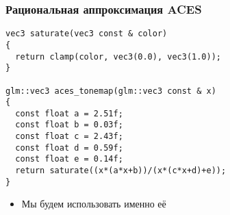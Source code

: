 \documentclass[10pt,handout]{beamer}
\begin{document}
\begin{frame}[fragile]
\frametitle{Рациональная аппроксимация ACES}
\begin{verbatim}
vec3 saturate(vec3 const & color)
{
  return clamp(color, vec3(0.0), vec3(1.0));
}

glm::vec3 aces_tonemap(glm::vec3 const & x)
{
  const float a = 2.51f;
  const float b = 0.03f;
  const float c = 2.43f;
  const float d = 0.59f;
  const float e = 0.14f;
  return saturate((x*(a*x+b))/(x*(c*x+d)+e));
}
\end{verbatim}
\pause
\begin{itemize}
\item Мы будем использовать именно её
\end{itemize}
\end{frame}
\end{document}
